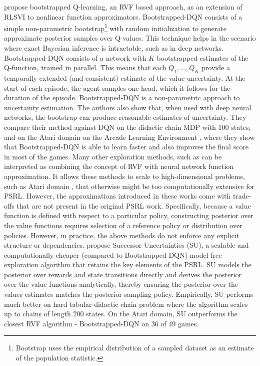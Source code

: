  propose bootstrapped Q-learning, an RVF based approach, as an extension of RLSVI to nonlinear function approximators. Bootstrapped-DQN consists of a simple non-parametric bootstrap\footnote{Bootstrap uses the empirical distribution of a sampled dataset as an estimate of the population statistic.} with random initialization to generate approximate posterior samples over Q-values. This technique helps in the scenario where exact Bayesian inference is intractable, such as in deep networks. Bootstrapped-DQN consists of a network with $K$ bootstrapped estimates of the Q-function, trained in parallel. This means that each $Q_1, \dots, Q_K$ provide a temporally extended (and consistent) estimate of the value uncertainty. At the start of each episode, the agent samples one head, which it follows for the duration of the episode. Bootstrapped-DQN is a non-parametric approach to uncertainty estimation. The authors also show that, when used with deep neural networks, the bootstrap can produce reasonable estimates of uncertainty. They compare their method against DQN  on the didactic chain MDP with 100 states, and on the Atari domain on the Arcade Learning Environment , where they show that Bootstrapped-DQN is able to learn faster and also improves the final score in most of the games.
Many other exploration methods, such as  can be interpreted as combining the concept of RVF with neural network function approximation. It allows these methods to scale to high-dimensional problems, such as Atari domain , that otherwise might be too computationally extensive for PSRL. However, the approximations introduced in these works come with trade-offs that are not present in the original PSRL work.  Specifically, because a value function is defined with respect to a particular policy, constructing posterior over the value functions requires selection of a reference policy or distribution over policies.  
However, in practice, the above methods do not enforce any explicit structure or dependencies.  propose Successor Uncertainties (SU), a scalable and computationally cheaper (compared to Bootstrapped DQN) model-free exploration algorithm that retains the key elements of the PSRL.  SU models the posterior over rewards and state transitions directly and derives the posterior over the value functions analytically, thereby ensuring the posterior over the values estimates matches the posterior sampling policy. Empirically, SU performs much better on hard tabular didactic chain problem where the algorithm scales up to chains of length 200 states. On the Atari domain, SU outperforms the closest RVF algorithm - Bootstrapped-DQN on 36 of 49 games.

